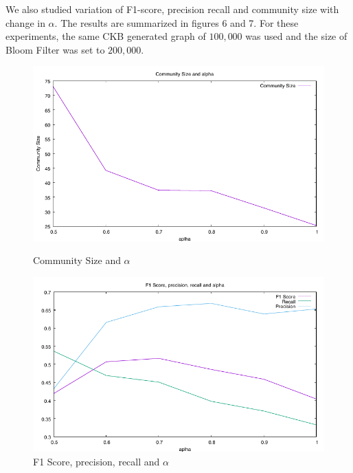 \documentclass[a4paper]{article}
\begin{document}
 We also studied variation of F1-score, precision recall and community size with change in $\alpha$. The results are summarized in figures 6 and 7. For these experiments, the same CKB generated graph of $100,000$ was used and the size of Bloom Filter was set to $200,000$.

\begin{figure}[h!]
    \centering
    \begin{minipage}{0.45\textwidth}
        \centering
       \includegraphics[width=1\textwidth]{CommunitySize.pdf}
\caption{\label{fig:Community Size and $\alpha$}Community Size and $\alpha$}
    \end{minipage}\hfill
    \begin{minipage}{0.45\textwidth}
        \centering
       \includegraphics[width=1\textwidth]{40.pdf}
\caption{\label{fig:F1 Score, precision, recall and $\alpha$}F1 Score, precision, recall and $\alpha$}
    \end{minipage}
\end{figure}





\clearpage


\end{document}
